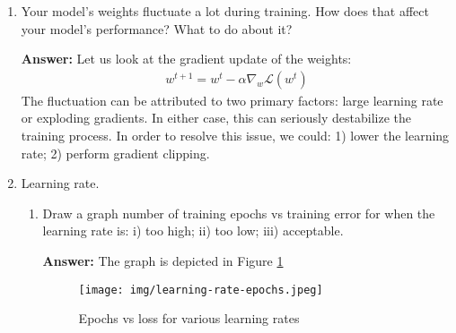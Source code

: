 \documentclass{article}
\newenvironment{QandA}{\begin{enumerate}[label=\arabic*.]}{\end{enumerate}}
\newenvironment{InnerQandA}{\begin{enumerate}[label=\roman*.]}{\end{enumerate}}
\newenvironment{answer}{\par\normalfont \textbf{Answer:}}{}
\begin{document}
\begin{QandA}
\begin{answer}
        (Source: \href{https://stats.stackexchange.com/questions/242004/why-do-neural-network-researchers-care-about-epochs}{StackExchange})
    \end{answer}

    \item Your model’s weights fluctuate a lot during training. How does that affect your model’s performance? What to do about it?
    \begin{answer}
        Let us look at the gradient update of the weights:
        \begin{align*}
            w^{t+1} = w^t - \alpha \nabla_w \mathcal{L}(w^t)
        \end{align*}
        The fluctuation can be attributed to two primary factors: large learning rate or exploding gradients. In either case, this can seriously destabilize the training process. In order to resolve this issue, we could: 1) lower the learning rate; 2) perform gradient clipping. 
    \end{answer}

    \item Learning rate.
    \begin{InnerQandA}
        \item Draw a graph number of training epochs vs training error for when the learning rate is: i) too high; ii) too low; iii) acceptable.
        \begin{answer}
            The graph is depicted in Figure \ref{learning-rate-epochs}
        \end{answer}
        \begin{figure}[h!]
            \centering
            \texttt{[image: img/learning-rate-epochs.jpeg]}
            \caption{Epochs vs loss for various learning rates\footnotemark }
            \label{learning-rate-epochs}
        \end{figure}


\end{InnerQandA}
\end{QandA}
\end{document}
